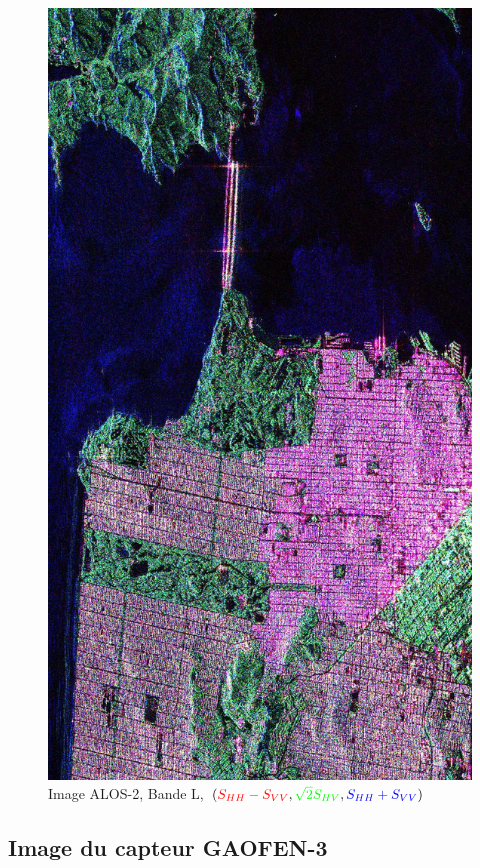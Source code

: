 \begin{figure}
  \includegraphics[height=0.95\textheight]{figures/Chap4/ALOS2-T3_RGB_reh.jpg}
  \centering
  \caption{
  \small{Image ALOS-2, Bande L, $(\textcolor{red}{S_{HH}-S_{VV}}, \textcolor{green}{\sqrt{2}S_{HV}}, \textcolor{blue}{S_{HH}+S_{VV}})$}
  }
  \label{fig:sanfrancisco-alos2-diagram}
\end{figure}

\subsection{Image du capteur GAOFEN-3}

